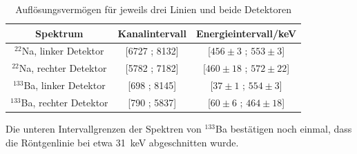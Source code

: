 \begin{table}[h]
\centering
\caption{Auflösungsvermögen für jeweils drei Linien und beide Detektoren}
\label{tab:intervalle}
\begin{tabular}{ccc}
\toprule
Spektrum & Kanalintervall & Energieintervall/\si{\kilo\electronvolt}\\
\midrule
$^{22}$Na, linker Detektor & [6727 ; 8132] &[$456 \pm 3$ ; $553 \pm 3$]\\ 
$^{22}$Na, rechter Detektor & [5782 ; 7182] & [$460 \pm 18$ ; $572 \pm 22$]\\
$^{133}$Ba, linker Detektor & [698 ; 8145] &[$37 \pm 1$ ; $554 \pm 3$]\\ 
$^{133}$Ba, rechter Detektor & [790 ; 5837] & [$60 \pm 6$ ; $464 \pm 18$]\\
\bottomrule
\end{tabular}
\end{table}

Die unteren Intervallgrenzen der Spektren von $^{133}$Ba bestätigen noch einmal, dass die Röntgenlinie bei etwa \SI{31}{\kilo\electronvolt} abgeschnitten wurde.
